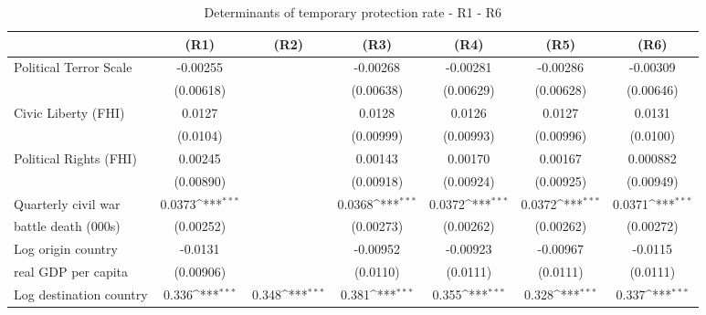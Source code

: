 \begin{table}[!ht]\centering \scriptsize
\def\sym#1{\ifmmode^{#1}\else\(^{#1}\)\fi}
\caption{Determinants of temporary protection rate - R1 - R6}
\begin{tabular}{l*{6}{c}}
\hline\hline
                   &\multicolumn{1}{c}{(R1)}&\multicolumn{1}{c}{(R2)}&\multicolumn{1}{c}{(R3)}&\multicolumn{1}{c}{(R4)}&\multicolumn{1}{c}{(R5)}&\multicolumn{1}{c}{(R6)}\\
\hline
Political Terror Scale&    -0.00255         &                     &    -0.00268         &    -0.00281         &    -0.00286         &    -0.00309         \\
                    &   (0.00618)         &                     &   (0.00638)         &   (0.00629)         &   (0.00628)         &   (0.00646)         \\
[0,5em]
Civic Liberty (FHI) &      0.0127         &                     &      0.0128         &      0.0126         &      0.0127         &      0.0131         \\
                    &    (0.0104)         &                     &   (0.00999)         &   (0.00993)         &   (0.00996)         &    (0.0100)         \\
[0,5em]
Political Rights (FHI)&     0.00245         &                     &     0.00143         &     0.00170         &     0.00167         &    0.000882         \\
                    &   (0.00890)         &                     &   (0.00918)         &   (0.00924)         &   (0.00925)         &   (0.00949)         \\
[0,5em]
Quarterly civil war&      0.0373\sym{***}&                     &      0.0368\sym{***}&      0.0372\sym{***}&      0.0372\sym{***}&      0.0371\sym{***}\\
 battle death (000s)                    &   (0.00252)         &                     &   (0.00273)         &   (0.00262)         &   (0.00262)         &   (0.00272)         \\
[0,5em]
Log origin country &     -0.0131         &                     &    -0.00952         &    -0.00923         &    -0.00967         &     -0.0115         \\
real GDP per capita                    &   (0.00906)         &                     &    (0.0110)         &    (0.0111)         &    (0.0111)         &    (0.0111)         \\
[0,5em]
Log destination country&       0.336\sym{***}&       0.348\sym{***}&       0.381\sym{***}&       0.355\sym{***}&       0.328\sym{***}&       0.337\sym{***}\\

\end{tabular}
\end{table}
